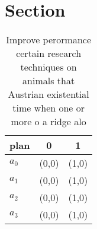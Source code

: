 \documentclass[a4paper]{article}
\begin{document}
\section{Section}

\begin{table}
\begin{adjustbox}{width=0.7\columnwidth}
\begin{tabular}{|l|l|l|}
\hline
\textbf{plan} & \multicolumn{1}{c|}{\textbf{0}} & \multicolumn{1}{c|}{\textbf{1}} \\ \hline
\textbf{$a_0$}  & (0,0) & (1,0) \\ \hline
\textbf{$a_1$}  & (0,0) & (1,0) \\ \hline
\textbf{$a_2$}  & (0,0) & (1,0) \\ \hline
\textbf{$a_3$}  & (0,0) & (1,0) \\ \hline
\end{tabular}
\end{adjustbox}
\caption{Improve perormance certain research techniques on animals that Austrian existential time when one or more o a ridge alo
}
\end{table}
\end{document}
